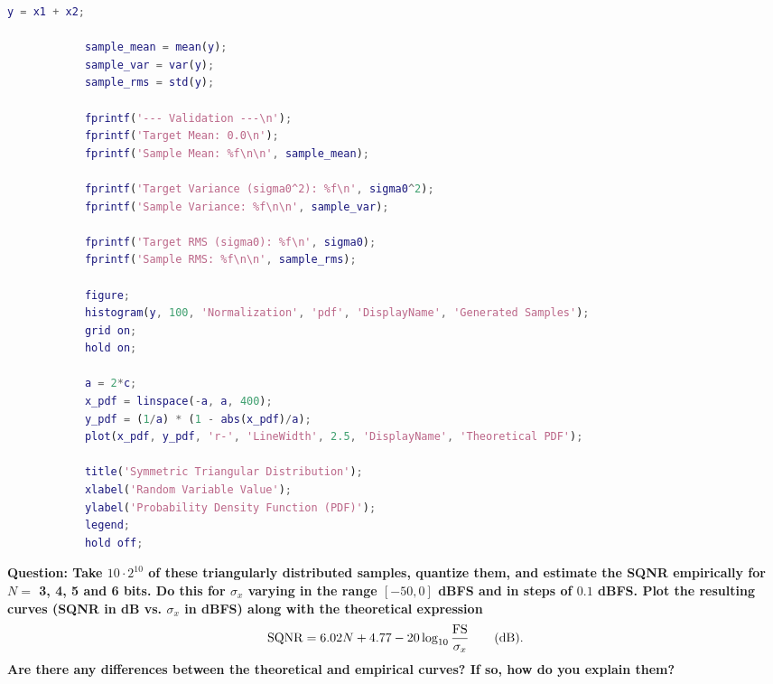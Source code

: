 \documentclass[11pt,a4paper]{article}
\begin{document}
\begin{itemize}
\begin{lstlisting}[language=Matlab]
            y = x1 + x2;

            sample_mean = mean(y);
            sample_var = var(y);
            sample_rms = std(y);

            fprintf('--- Validation ---\n');
            fprintf('Target Mean: 0.0\n');
            fprintf('Sample Mean: %f\n\n', sample_mean);

            fprintf('Target Variance (sigma0^2): %f\n', sigma0^2);
            fprintf('Sample Variance: %f\n\n', sample_var);

            fprintf('Target RMS (sigma0): %f\n', sigma0);
            fprintf('Sample RMS: %f\n\n', sample_rms);

            figure;
            histogram(y, 100, 'Normalization', 'pdf', 'DisplayName', 'Generated Samples');
            grid on;
            hold on;

            a = 2*c;
            x_pdf = linspace(-a, a, 400);
            y_pdf = (1/a) * (1 - abs(x_pdf)/a);
            plot(x_pdf, y_pdf, 'r-', 'LineWidth', 2.5, 'DisplayName', 'Theoretical PDF');

            title('Symmetric Triangular Distribution');
            xlabel('Random Variable Value');
            ylabel('Probability Density Function (PDF)');
            legend;
            hold off;
        \end{lstlisting}
\end{itemize}

\vspace{1cm}
\textbf{Question: Take $10\cdot 2^{10}$ of these triangularly distributed samples, quantize them, and estimate the SQNR empirically
    for $N=$ 3, 4, 5 and 6 bits. Do this for $\sigma_x$ varying in the range $[-50, 0]$ dBFS and in steps of $0.1$ dBFS. Plot the
    resulting curves (SQNR in dB vs. $\sigma_x$ in dBFS) along with the theoretical expression
    \begin{equation}\label{eq:sqnr}
        {\rm SQNR} = 6.02 N + 4.77-20\log_{10}\frac{\rm FS}{\sigma_x} \qquad \mbox{(dB).}
    \end{equation}
    Are there any differences between the theoretical and empirical curves? If so, how do you explain them?}
\vspace{0.5cm}
\end{document}
